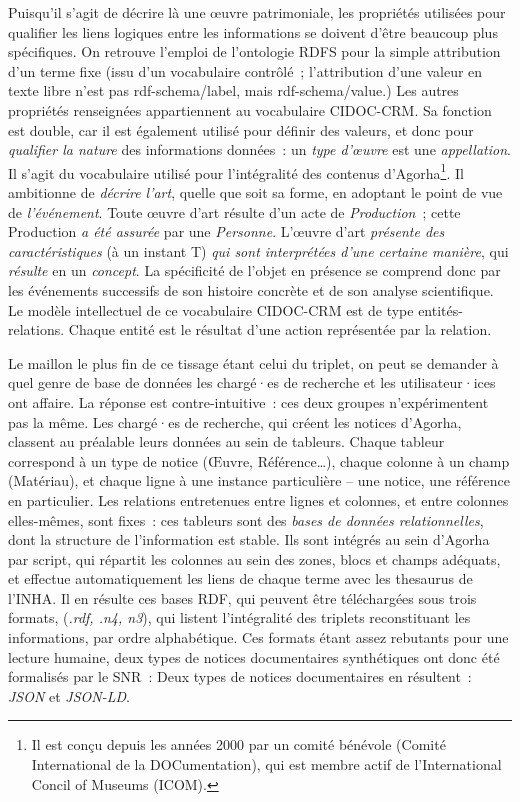\documentclass[a4paper,12pt, twoside]{book}
\begin{document}
Puisqu’il s’agit de décrire là une œuvre patrimoniale, les propriétés utilisées pour qualifier les liens logiques entre les informations se doivent d’être beaucoup plus spécifiques. On retrouve l’emploi de l’ontologie RDFS pour la simple attribution d’un terme fixe (issu d’un vocabulaire contrôlé~; l’attribution d’une valeur en texte libre n’est pas \textsf{rdf-schema/label}, mais \textsf{rdf-schema/value}.) Les autres propriétés renseignées appartiennent au vocabulaire CIDOC-CRM. Sa fonction est double, car il est également utilisé pour définir des valeurs, et donc pour \textit{qualifier la nature} des informations données~: un \textit{type d’œuvre} est une \textit{appellation}. Il s’agit du vocabulaire utilisé pour l’intégralité des contenus d’Agorha\footnote{Il est conçu depuis les années 2000 par un comité bénévole (Comité International de la DOCumentation), qui est membre actif de l’International Concil of Museums (ICOM).}. Il ambitionne de \textit{décrire l’art}, quelle que soit sa forme, en adoptant le point de vue de \textit{l’événement}. Toute œuvre d’art résulte d’un acte de \textit{Production}~; cette Production \textit{a été assurée} par une \textit{Personne}. L’œuvre d’art \textit{présente des caractéristiques} (à un instant T) \textit{qui sont interprétées d’une certaine manière}, qui \textit{résulte} en un \textit{concept}. La spécificité de l’objet en présence se comprend donc par les événements successifs de son histoire concrète et de son analyse scientifique. Le modèle intellectuel de ce vocabulaire CIDOC-CRM est de type entités-relations. Chaque entité est le résultat d’une action représentée par la relation.

Le maillon le plus fin de ce tissage étant celui du triplet, on peut se demander à quel genre de base de données les chargé·es de recherche et les utilisateur·ices ont affaire. La réponse est contre-intuitive~: ces deux groupes n’expérimentent pas la même. Les chargé·es de recherche, qui créent les notices d’Agorha, classent au préalable leurs données au sein de tableurs. Chaque tableur correspond à un type de notice (\textsf{Œuvre, Référence}…), chaque colonne à un champ (\textsf{Matériau}), et chaque ligne à une instance particulière – une notice, une référence en particulier. Les relations entretenues entre lignes et colonnes, et entre colonnes elles-mêmes, sont fixes~: ces tableurs sont des \textit{bases de données relationnelles}, dont la structure de l’information est stable. Ils sont intégrés au sein d’Agorha par script, qui répartit les colonnes au sein des zones, blocs et champs adéquats, et effectue automatiquement les liens de chaque terme avec les thesaurus de l’INHA. Il en résulte ces bases RDF, qui peuvent être téléchargées sous trois formats, (\textit{.rdf, .n4, n3}), qui listent l’intégralité des triplets reconstituant les informations, par ordre alphabétique. Ces formats étant assez rebutants pour une lecture humaine, deux types de notices documentaires synthétiques ont donc été formalisés par le SNR~: Deux types de notices documentaires en résultent~: \textit{JSON} et \textit{JSON-LD}.
\end{document}
